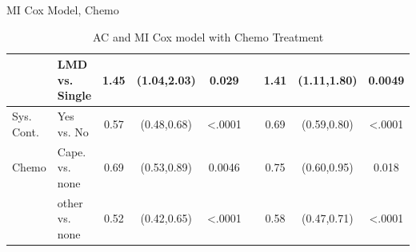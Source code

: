 \begin{frame}{MI Cox Model, Chemo}
\begin{table}[]
{\begin{tabular}{|l|l|c|c|c|c|c|c|c|}
                               & LMD vs. Single                   & 1.45                                                & (1.04,2.03)           & 0.029                 &                       & 1.41                  & (1.11,1.80) & 0.0049                                                      \\ \hline
Sys. Cont.                     & Yes vs. No                       & 0.57                                                & (0.48,0.68)           & \textless .0001       &                       & 0.69                  & (0.59,0.80) & \textless .0001                                             \\ \hline
Chemo                          & Cape. vs. none                   & 0.69                                                & (0.53,0.89)           & 0.0046                &                       & 0.75                  & (0.60,0.95) & 0.018                                                       \\ \hline
                               & other vs. none                   & 0.52                                                & (0.42,0.65)           & \textless .0001       &                       & 0.58                  & (0.47,0.71) & \textless .0001                                             \\ \hline
\end{tabular}
}
\caption{AC and MI Cox model with Chemo Treatment}
\label{acmi_cox_chemo}
\end{table} 
\end{frame}


